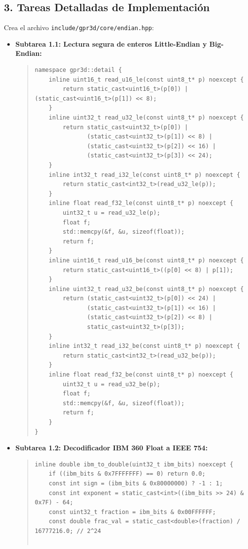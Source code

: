 \documentclass[11pt,a4paper]{article}
\begin{document}
\subsection{3. Tareas Detalladas de Implementación}
Crea el archivo \texttt{include/gpr3d/core/endian.hpp}:
\begin{itemize}
    \item \textbf{Subtarea 1.1: Lectura segura de enteros Little-Endian y Big-Endian:}
\begin{quote}
\small
\begin{verbatim}
namespace gpr3d::detail {
    inline uint16_t read_u16_le(const uint8_t* p) noexcept {
        return static_cast<uint16_t>(p[0]) | (static_cast<uint16_t>(p[1]) << 8);
    }
    inline uint32_t read_u32_le(const uint8_t* p) noexcept {
        return static_cast<uint32_t>(p[0]) |
               (static_cast<uint32_t>(p[1]) << 8) |
               (static_cast<uint32_t>(p[2]) << 16) |
               (static_cast<uint32_t>(p[3]) << 24);
    }
    inline int32_t read_i32_le(const uint8_t* p) noexcept {
        return static_cast<int32_t>(read_u32_le(p));
    }
    inline float read_f32_le(const uint8_t* p) noexcept {
        uint32_t u = read_u32_le(p);
        float f;
        std::memcpy(&f, &u, sizeof(float));
        return f;
    }
    inline uint16_t read_u16_be(const uint8_t* p) noexcept {
        return static_cast<uint16_t>((p[0] << 8) | p[1]);
    }
    inline uint32_t read_u32_be(const uint8_t* p) noexcept {
        return (static_cast<uint32_t>(p[0]) << 24) |
               (static_cast<uint32_t>(p[1]) << 16) |
               (static_cast<uint32_t>(p[2]) << 8) |
               static_cast<uint32_t>(p[3]);
    }
    inline int32_t read_i32_be(const uint8_t* p) noexcept {
        return static_cast<int32_t>(read_u32_be(p));
    }
    inline float read_f32_be(const uint8_t* p) noexcept {
        uint32_t u = read_u32_be(p);
        float f;
        std::memcpy(&f, &u, sizeof(float));
        return f;
    }
}
\end{verbatim}
\end{quote}

    \item \textbf{Subtarea 1.2: Decodificador IBM 360 Float a IEEE 754:}
\begin{quote}
\small
\begin{verbatim}
inline double ibm_to_double(uint32_t ibm_bits) noexcept {
    if ((ibm_bits & 0x7FFFFFFF) == 0) return 0.0;
    const int sign = (ibm_bits & 0x80000000) ? -1 : 1;
    const int exponent = static_cast<int>((ibm_bits >> 24) & 0x7F) - 64;
    const uint32_t fraction = ibm_bits & 0x00FFFFFF;
    const double frac_val = static_cast<double>(fraction) / 16777216.0; // 2^24


\end{verbatim}
\end{quote}
\end{itemize}
\end{document}
